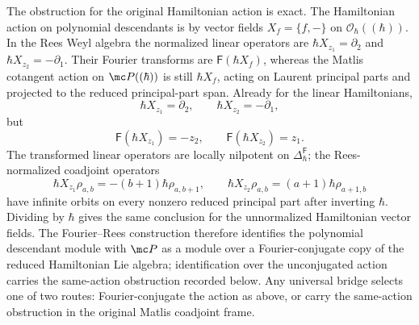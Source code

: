 \begin{thm}
  The obstruction for the original Hamiltonian action is exact.  The
  Hamiltonian action on polynomial descendants is by vector fields
  \(X_f=\{f,-\}\) on \(\mathcal O_\hbar((\hbar))\).  In the Rees Weyl
  algebra the normalized linear operators are
  \(\hbar X_{z_1}=\partial_2\) and
  \(\hbar X_{z_2}=-\partial_1\).  Their Fourier transforms are
  \(\mathsf F(\hbar X_f)\), whereas the Matlis cotangent action on
  \(\mc P((\hbar))\) is still \(\hbar X_f\), acting on Laurent
  principal parts and projected to the reduced principal-part span.
  Already for the linear Hamiltonians,
  \[
    \hbar X_{z_1}=\partial_2,\qquad
    \hbar X_{z_2}=-\partial_1,
  \]
  but
  \[
    \mathsf F(\hbar X_{z_1})=-z_2,\qquad
    \mathsf F(\hbar X_{z_2})=z_1 .
  \]
  The transformed linear operators are locally nilpotent on
  \(\Delta^{\mathsf F}_\hbar\); the Rees-normalized coadjoint operators
  \[
    \hbar X_{z_1}\rho_{a,b}=-(b+1)\hbar\rho_{a,b+1},\qquad
    \hbar X_{z_2}\rho_{a,b}=(a+1)\hbar\rho_{a+1,b}
  \]
  have infinite orbits on every nonzero reduced principal part after
  inverting \(\hbar\).  Dividing by \(\hbar\) gives the same conclusion
  for the unnormalized Hamiltonian vector fields.  The
  Fourier--Rees construction therefore identifies the polynomial
  descendant module with \(\mc P\) as a module over a Fourier-conjugate
  copy of the reduced Hamiltonian Lie algebra; identification over the
  unconjugated action carries the same-action obstruction recorded
  below.  Any universal bridge selects one of two routes:
  Fourier-conjugate the action as above, or carry the same-action
  obstruction in the original Matlis coadjoint frame.
\end{thm}

